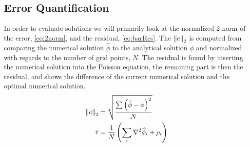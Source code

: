 

\subsection{Error Quantification}
	\label{sec:errorQuant}
	In order to evaluate solutions we will primarily look at the normalized 2-norm of the error, \cref{eq:2norm},
	and the residual, \cref{eq:barRes}. The \(\norm{ e }_2\) is computed from comparing the numerical
	solution \(\widehat{\phi}\) to the analytical solution \(\phi\) and normalized with regards to the number of grid points, \(N\).
	The residual is found by inserting the numerical solution into the Poisson equation, the remaining
	part is then the residual, and shows the difference of the current numerical solution
	and the optimal numerical solution.
	\begin{align}
		\norm{ e }_2&= \sqrt{\frac{\sum \left(\hat\phi - \phi\right)^2}{N}}  \label{eq:2norm}
		\\
		\bar{r} &= \frac{1}{N}\left( \sum_i{ \nabla^2 \widehat{\phi}_i + \rho_i  }  \right) \label{eq:barRes}
	\end{align}
